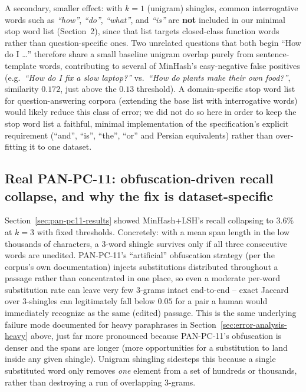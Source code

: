 \documentclass[11pt]{article}
\begin{document}
A secondary, smaller effect: with $k=1$ (unigram) shingles, common interrogative words such as
\emph{``how''}, \emph{``do''}, \emph{``what''}, and \emph{``is''} are \textbf{not} included in our
minimal stop word list (Section~2), since that list targets closed-class function words rather than
question-specific ones. Two unrelated questions that both begin ``How do I \ldots'' therefore share a
small baseline unigram overlap purely from sentence-template words, contributing to several of MinHash's
easy-negative false positives (e.g.\ \emph{``How do I fix a slow laptop?''} vs.\ \emph{``How do plants
make their own food?''}, similarity $0.172$, just above the $0.13$ threshold). A domain-specific stop word
list for question-answering corpora (extending the base list with interrogative words) would likely reduce
this class of error; we did not do so here in order to keep the stop word list a faithful, minimal
implementation of the specification's explicit requirement (``and'', ``is'', ``the'', ``or'' and Persian
equivalents) rather than over-fitting it to one dataset.

\subsection{Real PAN-PC-11: obfuscation-driven recall collapse, and why the fix is dataset-specific}
\label{sec:error-analysis-pan}

Section~\ref{sec:pan-pc11-results} showed MinHash+LSH's recall collapsing to $3.6\%$ at $k=3$ with fixed
thresholds. Concretely: with a mean span length in the low thousands of characters, a $3$-word shingle
survives only if all three consecutive words are unedited. PAN-PC-11's ``artificial'' obfuscation strategy
(per the corpus's own documentation) injects substitutions distributed throughout a passage rather than
concentrated in one place, so even a moderate per-word substitution rate can leave very few 3-grams intact
end-to-end -- exact Jaccard over 3-shingles can legitimately fall below $0.05$ for a pair a human would
immediately recognize as the same (edited) passage. This is the same underlying failure mode documented for
heavy paraphrases in Section~\ref{sec:error-analysis-heavy} above, just far more pronounced because
PAN-PC-11's obfuscation is denser and the spans are longer (more opportunities for a substitution to land
inside any given shingle). Unigram shingling sidesteps this because a single substituted word only removes
\emph{one} element from a set of hundreds or thousands, rather than destroying a run of overlapping
3-grams.
\end{document}
